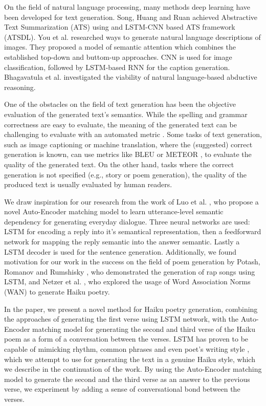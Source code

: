 \documentclass{acm_proc_article-sp}
\begin{document}
On the field of natural language processing, many methods deep learning have been developed for text generation. Song, Huang and Ruan \cite{song2019abstractive} achieved Abstractive Text Summarization (ATS) using and LSTM-CNN based ATS framework (ATSDL). You et al. \cite{You_2016_CVPR} researched ways to generate natural language descriptions of images. They proposed a model of semantic attention which combines the established top-down and buttom-up approaches. CNN is used for image classification, followed by LSTM-based RNN for the caption generation. Bhagavatula et al. \cite{bhagavatula2020abductive} investigated the viability of natural language-based abductive reasoning.

One of the obstacles on the field of text generation has been the objective evaluation of the generated text's semantics. While the spelling and grammar correctness are easy to evaluate, the meaning of the generated text can be challenging to evaluate with an automated metric \cite{celikyilmaz2020evaluation}. Some tasks of text generation, such as image captioning or machine translation, where the (suggested) correct generation is known, can use metrics like BLEU \cite{papineni2002bleu} or METEOR \cite{banerjee2005meteor}, to evaluate the quality of the generated text. On the other hand, tasks where the correct generation is not specified (e.g., story \cite{pawade2018story} or poem \cite{zhang2014chinese} generation), the quality of the produced text is usually evaluated by human readers.

We draw inspiration for our research from the work of Luo et al. \cite{luo2018autoencoder}, who propose a novel Auto-Encoder matching model to learn utterance-level semantic dependency for generating everyday dialogue. Three neural networks are used: LSTM for encoding a reply into it's semantical representation, then a feedforward network for mapping the reply semantic into the answer semantic. Lastly a LSTM decoder is used for the sentence generation. Additionally, we found motivation for our work in the success on the field of poem generation by Potash, Romanov and Rumshisky \cite{potash2015ghostwriter}, who demonstrated the generation of rap songs using LSTM, and Netzer et al. \cite{netzer2009gaiku}, who explored the usage of Word Association Norms (WAN) to generate Haiku poetry.

In the paper, we present a novel method for Haiku poetry generation, combining the approaches of generating the first verse using LSTM network, with the Auto-Encoder matching model \cite{luo2018autoencoder} for generating the second and third verse of the Haiku poem as a form of a conversation between the verses. LSTM has proven to be capable of mimicking rhythm, common phrases and even poet's writing style \cite{potash2015ghostwriter}, which we attempt to use for generating the text in a genuine Haiku style, which we describe in the continuation of the work. By using the Auto-Encoder matching model to generate the second and the third verse as an answer to the previous verse, we experiment by adding a sense of conversational bond between the verses.
\end{document}
